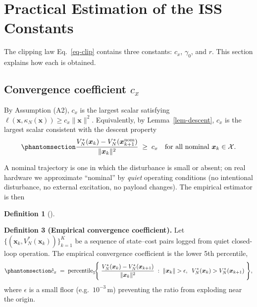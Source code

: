 \documentclass[
  11pt,
]{article}
\theoremstyle{plain}
\theoremstyle{plain}
\theoremstyle{definition}
\newtheorem{definition}{Definition}[section]
\theoremstyle{remark}
\begin{document}
\section{Practical Estimation of the ISS Constants}\label{sec-estim}

The clipping law Eq.~\ref{eq-clip} contains three constants: \(c_x\),
\(\gamma_0\), and \(r\). This section explains how each is obtained.

\subsection{\texorpdfstring{Convergence coefficient
\(c_x\)}{Convergence coefficient c\_x}}\label{sec-estim-cx}

By Assumption (A2), \(c_x\) is the largest scalar satisfying
\(\ell(\bm{x},\kappa_N(\bm{x})) \ge c_x \|\bm{x}\|^2\). Equivalently, by
Lemma~\ref{lem-descent}, \(c_x\) is the largest scalar consistent with
the descent property
\begin{equation}\protect\phantomsection\label{eq-cx-defn}{
\frac{V_N^*(\bm{x}_k) - V_N^*(\bm{x}_{k+1}^{\mathrm{nom}})}
     {\|\bm{x}_k\|^2}
\;\ge\; c_x
\quad\text{for all nominal } \bm{x}_k\in\mathcal{X}.
}\end{equation}

A nominal trajectory is one in which the disturbance is small or absent;
on real hardware we approximate ``nominal'' by \emph{quiet} operating
conditions (no intentional disturbance, no external excitation, no
payload changes). The empirical estimator is then

\begin{definition}[]\protect\hypertarget{def-cx-emp}{}\label{def-cx-emp}

\textbf{Definition 3 (Empirical convergence coefficient).} Let
\(\{(\bm{x}_k, V_N^*(\bm{x}_k))\}_{k=1}^{K}\) be a sequence of
state--cost pairs logged from quiet closed-loop operation. The empirical
convergence coefficient is the lower 5th percentile,
\begin{equation}\protect\phantomsection\label{eq-cx-emp}{
\hat{c}_x \;=\;
\mathrm{percentile}_{5}\!\Biggl\{\;
\frac{V_N^*(\bm{x}_k) - V_N^*(\bm{x}_{k+1})}
     {\|\bm{x}_k\|^2}
\;:\;
\|\bm{x}_k\| > \epsilon,\;\;
V_N^*(\bm{x}_k) > V_N^*(\bm{x}_{k+1})
\;\Biggr\},
}\end{equation} where \(\epsilon\) is a small floor
(e.g.~\(10^{-3}\,\)m) preventing the ratio from exploding near the
origin.

\end{definition}
\end{document}
